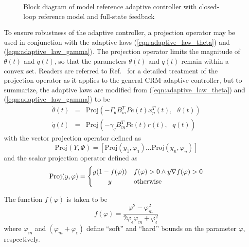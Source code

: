 \begin{figure}[t]

	\caption{Block diagram of model reference adaptive controller with closed-loop reference model and full-state feedback}
	\label{fig:mrac_block}
\end{figure}

To ensure robustness of the adaptive controller, a projection operator \cite{pomet1992adaptive, lavretsky2011projection} may be used in conjunction with the adaptive laws (\ref{eqn:adaptive_law_theta}) and (\ref{eqn:adaptive_law_gamma}). The projection operator limits the magnitude of $\dot{\theta}(t)$ and $\dot{q}(t)$, so that the parameters $\theta(t)$ and $q(t)$ remain within a convex set. Readers are referred to Ref.~\cite{gibson2013adaptive} for a detailed treatment of the projection operator as it applies to the general CRM-adaptive controller, but to summarize, the adaptive laws are modified from (\ref{eqn:adaptive_law_theta}) and (\ref{eqn:adaptive_law_gamma}) to be
\begin{eqnarray}
	\dot{\theta}(t) &=& \text{Proj}(- \Gamma_\theta B_m^T P e(t) x_p^T(t),\text{ } \theta(t)) \label{eqn:thetadot_projection} \\
	\dot{q}(t) &=& \text{Proj}(- \gamma_q B_m^T P e(t) r(t),\text{ } q(t)) \label{eqn:qdot_projection}
\end{eqnarray}
\noindent with the vector projection operator defined as
\begin{equation}
	\text{Proj}(Y, \Phi) = \left[ \text{Proj}(y_1, \varphi_1) \ldots \text{Proj}(y_n, \varphi_n) \right]
\end{equation}
\noindent and the scalar projection operator defined as
\begin{equation}
	\text{Proj}(y, \varphi) = \begin{cases}
		y(1 - f(\varphi)) & f(\varphi) > 0 \land y \nabla f(\varphi) > 0\\
		\hfil y & \text{otherwise}
	\end{cases}
\end{equation}

\noindent The function $f(\varphi)$ is taken to be
\begin{equation}
	f(\varphi) = \frac{\varphi^2 - \varphi_{m}^2}{2 \varphi_{\epsilon} \varphi_{m} + \varphi_{\epsilon}^2}
	\label{eqn:proj_function}
\end{equation}
\noindent where $\varphi_{m}$ and $(\varphi_{m} + \varphi_{\epsilon})$ define ``soft'' and ``hard'' bounds on the parameter $\varphi$, respectively. 

